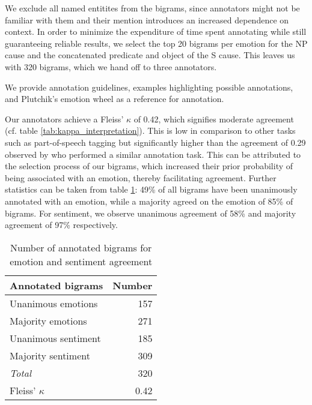 We exclude all named entitites from the bigrams, since annotators might not be familiar with them and their mention introduces an increased dependence on context.
In order to minimize the expenditure of time spent annotating while still guaranteeing reliable results, we select the top 20 bigrams per emotion for the NP cause and the concatenated predicate and object of the S cause. This leaves us with 320 bigrams, which we hand off to three annotators. 

We provide annotation guidelines, examples highlighting possible annotations, and Plutchik's emotion wheel as a reference for annotation.

Our annotators achieve a Fleiss' $\kappa$ of 0.42, which signifies moderate agreement \cite{kappa} (cf. table \ref{tab:kappa_interpretation}). This is low in comparison to other tasks such as part-of-speech tagging but significantly higher than the agreement of 0.29 observed by \citeauthor{nrc} who performed a similar annotation task. This can be attributed to the selection process of our bigrams, which increased their prior probability of being associated with an emotion, thereby facilitating agreement. Further statistics can be taken from table \ref{tab:annotation-bigrams}: 49\% of all bigrams have been unanimously annotated with an emotion, while a majority agreed on the emotion of 85\% of bigrams. For sentiment, we observe unanimous agreement of 58\% and majority agreement of 97\% respectively.

\begin{table}
\centering
\begin{tabular}{l|r}
\textbf{Annotated bigrams} & \textbf{Number}\\\hline
Unanimous emotions & 157\\
Majority emotions & 271\\
Unanimous sentiment & 185\\
Majority sentiment & 309\\\hline
\textit{Total} & 320\\\hline
Fleiss' $\kappa$ & 0.42
\end{tabular}
\caption{Number of annotated bigrams for emotion and sentiment agreement}
\label{tab:annotation-bigrams}
\end{table}

